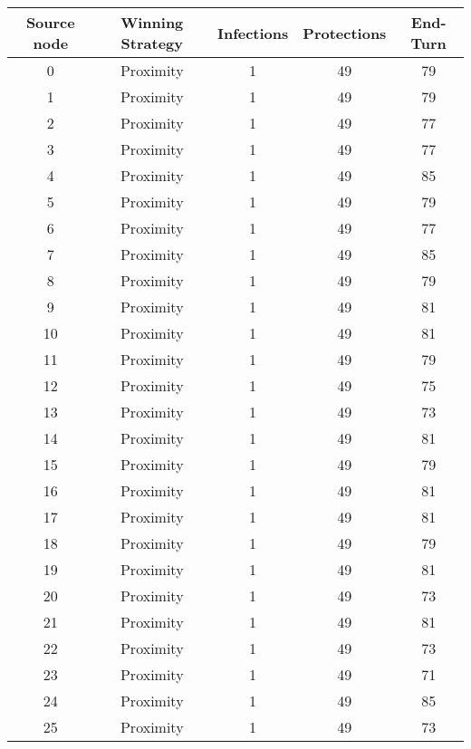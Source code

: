 \documentclass[results.tex]{subfiles}
\begin{document}
\begin{center}
  \begin{tabular}{| c || c | c | c | c |}
    \hline
    {\bfseries Source node} & {\bfseries Winning Strategy} & {\bfseries Infections} & {\bfseries Protections} & {\bfseries End-Turn} \\  %
    \hline\hline
    0 & Proximity & 1 & 49 & 79 \\ 
    \hline
    1 & Proximity & 1 & 49 & 79 \\ 
    \hline
    2 & Proximity & 1 & 49 & 77 \\ 
    \hline
    3 & Proximity & 1 & 49 & 77 \\ 
    \hline
    4 & Proximity & 1 & 49 & 85 \\ 
    \hline
    5 & Proximity & 1 & 49 & 79 \\ 
    \hline
    6 & Proximity & 1 & 49 & 77 \\ 
    \hline
    7 & Proximity & 1 & 49 & 85 \\ 
    \hline
    8 & Proximity & 1 & 49 & 79 \\ 
    \hline
    9 & Proximity & 1 & 49 & 81 \\ 
    \hline
    10 & Proximity & 1 & 49 & 81 \\ 
    \hline
    11 & Proximity & 1 & 49 & 79 \\ 
    \hline
    12 & Proximity & 1 & 49 & 75 \\ 
    \hline
    13 & Proximity & 1 & 49 & 73 \\ 
    \hline
    14 & Proximity & 1 & 49 & 81 \\ 
    \hline
    15 & Proximity & 1 & 49 & 79 \\ 
    \hline
    16 & Proximity & 1 & 49 & 81 \\ 
    \hline
    17 & Proximity & 1 & 49 & 81 \\ 
    \hline
    18 & Proximity & 1 & 49 & 79 \\ 
    \hline
    19 & Proximity & 1 & 49 & 81 \\ 
    \hline
    20 & Proximity & 1 & 49 & 73 \\ 
    \hline
    21 & Proximity & 1 & 49 & 81 \\ 
    \hline
    22 & Proximity & 1 & 49 & 73 \\ 
    \hline
    23 & Proximity & 1 & 49 & 71 \\ 
    \hline
    24 & Proximity & 1 & 49 & 85 \\ 
    \hline
    25 & Proximity & 1 & 49 & 73 \\ 

\end{tabular}
\end{center}
\end{document}
